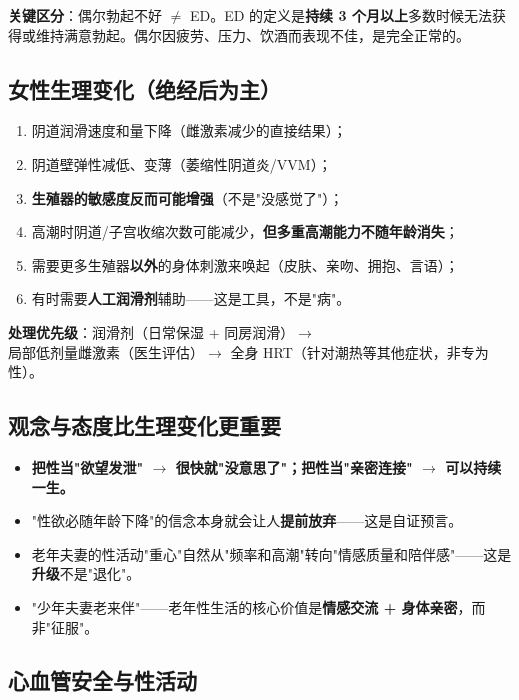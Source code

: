 \documentclass[12pt,UTF8,openany]{ctexbook}
\begin{document}
\noindent\textbf{关键区分}：偶尔勃起不好 $\ne$ ED。ED 的定义是\textbf{持续 3 个月以上}多数时候无法获得或维持满意勃起。偶尔因疲劳、压力、饮酒而表现不佳，是完全正常的。

\subsection*{女性生理变化（绝经后为主）}

\begin{enumerate}[leftmargin=2em,itemsep=0.3em]
  \item 阴道润滑速度和量下降（雌激素减少的直接结果）；
  \item 阴道壁弹性减低、变薄（萎缩性阴道炎/VVM）；
  \item \textbf{生殖器的敏感度反而可能增强}（不是"没感觉了"）；
  \item 高潮时阴道/子宫收缩次数可能减少，\textbf{但多重高潮能力不随年龄消失}；
  \item 需要更多生殖器\textbf{以外}的身体刺激来唤起（皮肤、亲吻、拥抱、言语）；
  \item 有时需要\textbf{人工润滑剂}辅助——这是工具，不是"病"。
\end{enumerate}

\noindent\textbf{处理优先级}：润滑剂（日常保湿 + 同房润滑）$\to$ 局部低剂量雌激素（医生评估）$\to$ 全身 HRT（针对潮热等其他症状，非专为性）。

\subsection*{观念与态度比生理变化更重要}

\begin{itemize}[leftmargin=2em,itemsep=0.3em]
  \item \textbf{把性当"欲望发泄" $\to$ 很快就"没意思了"；把性当"亲密连接" $\to$ 可以持续一生。}
  \item "性欲必随年龄下降"的信念本身就会让人\textbf{提前放弃}——这是自证预言。
  \item 老年夫妻的性活动"重心"自然从"频率和高潮"转向"情感质量和陪伴感"——这是\textbf{升级}不是"退化"。
  \item "少年夫妻老来伴"——老年性生活的核心价值是\textbf{情感交流 + 身体亲密}，而非"征服"。
\end{itemize}

\subsection*{心血管安全与性活动}
\end{document}
